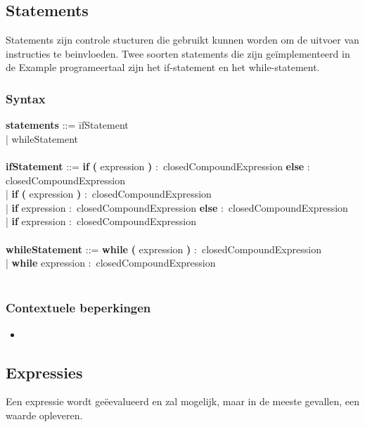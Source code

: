 \subsection{Statements}
Statements zijn controle stucturen die gebruikt kunnen worden om de uitvoer van instructies te beinvloeden. Twee soorten statements die zijn ge\"{i}mplementeerd in de Example programeertaal zijn het if-statement en het while-statement.
    \subsubsection{Syntax}
        \begin{tabbing}
        {\bf statements}                  ::= \=ifStatement\\
                                          \>| whileStatement\\
        \\
        {\bf ifStatement}                 ::= \=\textbf{if} \=\textbf{(} expression \textbf{)} $\colon$ closedCompoundExpression \textbf    {else} $\colon$ closedCompoundExpression\\
                                      \>| \textbf{if} \textbf{(} expression \textbf{)} $\colon$ closedCompoundExpression\\
                                      \>| \textbf{if} expression $\colon$ closedCompoundExpression \textbf{else} $\colon$ closedCompoundExpression\\
                                      \>| \textbf{if} expression $\colon$ closedCompoundExpression\\
        \\
        {\bf whileStatement}              ::= \=\textbf{while} \textbf{(} expression \textbf{)} $\colon$ closedCompoundExpression\\
                                      \>| \textbf{while} expression $\colon$ closedCompoundExpression\\
        \\ 
        \end{tabbing}
    \subsubsection{Contextuele beperkingen}
        \begin{itemize}
        \item 
        \end{itemize}

\subsection{Expressies}
Een expressie wordt ge\"{e}evalueerd en zal mogelijk, maar in de meeste gevallen, een waarde opleveren.
